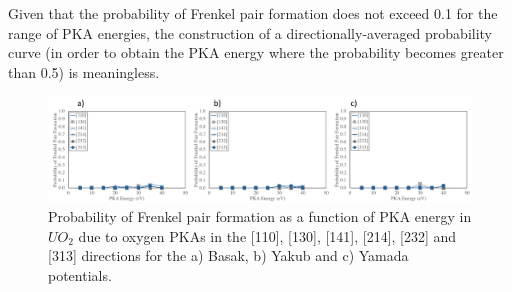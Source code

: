 \documentclass[8pt]{article}   	%
\begin{document}
Given that the probability of Frenkel pair formation does not exceed 0.1 for the range of PKA energies, the construction of a directionally-averaged probability curve (in order to obtain the PKA energy where the probability becomes greater than 0.5) is meaningless.

\begin{figure}[h]
 \centering
 \includegraphics[width=1.0\textwidth]{FP_O.png}
 \caption{Probability of Frenkel pair formation as a function of PKA energy in $UO_2$ due to oxygen PKAs in the [110], [130], [141], [214], [232] and [313] directions for the a) Basak, b) Yakub and c) Yamada potentials.  }
 \label{fig:fpo}
\end{figure}

\FloatBarrier
\end{document}
